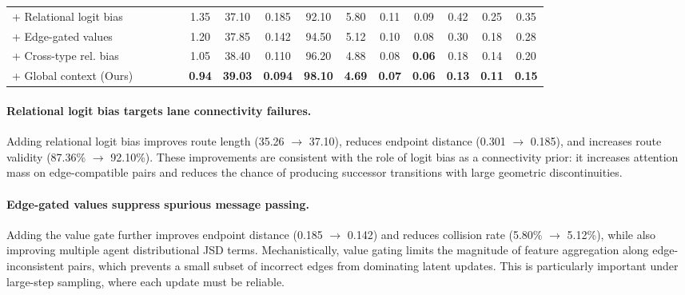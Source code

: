 \documentclass{article}
\newcommand{\cmark}{\textcolor{mydarkgray}{\ding{51}}}
\newcommand{\xmark}{\textcolor{mylightgray}{\ding{55}}}
\newcommand{\best}[1]{\textbf{#1}}
\theoremstyle{plain}
\theoremstyle{definition}
\theoremstyle{remark}
\begin{document}
\begin{table}[ht]
\begin{threeparttable}
\begin{tabular}{@{}l cccc c ccc c ccccc@{}}
+ Relational logit bias
& \cmark & \xmark & \xmark & \xmark
& 1.35 & 37.10 & 0.185 & 92.10 & 5.80 & 0.11 & 0.09 & 0.42 & 0.25 & 0.35 \\

+ Edge-gated values
& \cmark & \cmark & \xmark & \xmark
& 1.20 & 37.85 & 0.142 & 94.50 & 5.12 & 0.10 & 0.08 & 0.30 & 0.18 & 0.28 \\

+ Cross-type rel. bias
& \cmark & \cmark & \cmark & \xmark
& 1.05 & 38.40 & 0.110 & 96.20 & 4.88 & 0.08 & \best{0.06} & 0.18 & 0.14 & 0.20 \\

\rowcolor{oursrow}
+ Global context (Ours)
& \cmark & \cmark & \cmark & \cmark
& \best{0.94} & \best{39.03} & \best{0.094} & \best{98.10} & \best{4.69} & \best{0.07} & \best{0.06} & \best{0.13} & \best{0.11} & \best{0.15} \\

\bottomrule
\end{tabular}
\end{threeparttable}
\end{table}

\paragraph{Relational logit bias targets lane connectivity failures.}
Adding relational logit bias improves route length (35.26 \(\rightarrow\) 37.10), reduces endpoint distance (0.301 \(\rightarrow\) 0.185),
and increases route validity (87.36\% \(\rightarrow\) 92.10\%).
These improvements are consistent with the role of logit bias as a connectivity prior: it increases attention mass on edge-compatible pairs and
reduces the chance of producing successor transitions with large geometric discontinuities.

\paragraph{Edge-gated values suppress spurious message passing.}
Adding the value gate further improves endpoint distance (0.185 \(\rightarrow\) 0.142) and reduces collision rate (5.80\% \(\rightarrow\) 5.12\%),
while also improving multiple agent distributional JSD terms.
Mechanistically, value gating limits the magnitude of feature aggregation along edge-inconsistent pairs, which prevents a small subset of incorrect edges
from dominating latent updates. This is particularly important under large-step sampling, where each update must be reliable.
\end{document}
